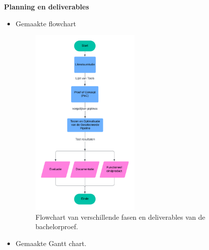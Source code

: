 \vspace{1em}
\textbf{Planning en deliverables}

\begin{itemize}
    \item Gemaakte flowchart
    
    \begin{figure}[H]  %
        \centering
        \includegraphics[width=0.5\textwidth]{foto's/Flowchart.png}  %
        \caption{Flowchart van verschillende fasen en deliverables van de bachelorproef.}
        \label{fig:flowchart}  %
    \end{figure}
    
    \item Gemaakte Gantt chart.
    
    \begin{figure}[H]  %
        \centering
\end{figure}
\end{itemize}
